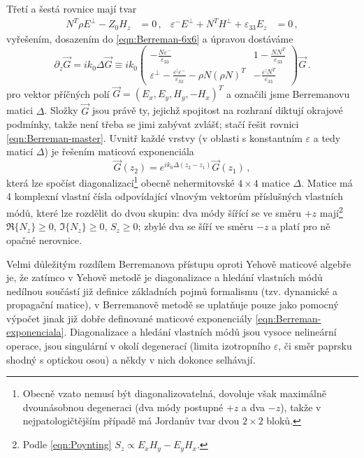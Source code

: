 Třetí a šestá rovnice mají tvar
\begin{align}
    N^T \rho E^\perp - Z_0 H_z &=0 \,, & \varepsilon^- E^\perp + N^T H^\perp + \varepsilon_{33} E_z &=0 \,,
\end{align}
vyřešením, dosazením do \eqref{eqn:Berreman-6x6} a úpravou dostáváme
\begin{equation} 
\label{eqn:Berreman-master}
    \partial_z \vec{G}
    = i k_0 \Delta \vec{G}
    \equiv i k_0 \begin{pmatrix}
        -\frac{N\varepsilon^-}{\varepsilon_{33}} & 1-\frac{NN^T}{\varepsilon_{33}} \\ \varepsilon^\perp - \frac{\varepsilon^\vert\varepsilon^-}{\varepsilon_{33}} - \rho N(\rho N)^T & - \frac{\varepsilon^\vert N^T}{\varepsilon_{33}}
    \end{pmatrix}
    \vec{G} \,.
\end{equation}
pro vektor příčných polí $\vec{G} = (E_x, E_y, H_y, -H_x)^T$ a označili jsme Berremanovu matici $\Delta$.
Složky $\vec{G}$ jsou právě ty, jejichž spojitost na rozhraní diktují okrajové podmínky, takže není třeba se jimi zabývat zvlášť; stačí řešit rovnici \eqref{eqn:Berreman-master}.
Uvnitř každé vrstvy (v oblasti s konstantním $\varepsilon$ a tedy maticí $\Delta$) je řešením maticová exponenciála
\begin{equation}
\label{eqn:Berreman-exponenciala}
    \vec{G}(z_2) = e^{ik_0\Delta(z_2-z_1)} \vec{G}(z_1) \,,
\end{equation}
která lze spočíst diagonalizací\footnote{Obecně vzato nemusí být diagonalizovatelná, dovoluje však maximálně dvounásobnou degeneraci (dva módy postupné $+z$ a dva $-z$), takže v nejpatologičtějším případě má Jordanův tvar dvou $2\times2$ bloků.} obecně nehermitovské $4\times 4$ matice $\Delta$.
Matice má 4 komplexní vlastní čísla odpovídající vlnovým vektorům příslušných vlastních módů, které lze rozdělit do dvou skupin:
dva módy šířící se ve směru $+z$ mají\footnote{Podle \eqref{eqn:Poynting} $S_z \propto E_xH_y-E_yH_x$.} $\Re\lbrace N_z \rbrace\geq0$, $\Im\lbrace N_z \rbrace\geq0$, $S_z\geq0$; zbylé dva se šíří ve směru $-z$ a platí pro ně opačné nerovnice.

Velmi důležitým rozdílem Berremanova přístupu oproti Yehově maticové algebře je,
že zatímco v Yehově metodě je diagonalizace a hledání vlastních módů nedílnou součástí již definice základních pojmů formalismu (tzv. dynamické a propagační matice),
v Berremanově metodě se uplatňuje pouze jako pomocný výpočet jinak již dobře definované maticové exponenciály \eqref{eqn:Berreman-exponenciala}.
Diagonalizace a hledání vlastních módů jsou vysoce nelineární operace, jsou singulární v okolí degenerací (limita izotropního $\varepsilon$, či směr paprsku shodný s optickou osou) a někdy v nich dokonce selhávají\cite{xuOpticalDegeneraciesAnisotropic2000,wuSingularitiesMatrixFormalisms2018,garibelloSingularityYehTransfer2020,bertrandGeneralAnalyticalTreatment2001}.

